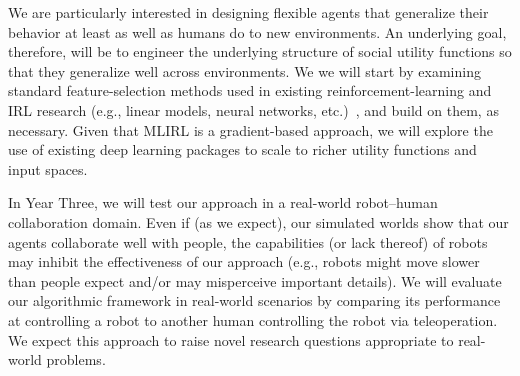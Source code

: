 We are particularly interested in designing flexible agents that
generalize their behavior at least as well as humans do to new
environments.
%
An underlying goal, therefore, will be to engineer the underlying
structure of social utility functions so that they generalize well
across environments.  We we will start by examining standard
feature-selection methods used in existing reinforcement-learning and
IRL 
research (e.g., linear models, neural networks,
etc.)~\cite{diuk2009adaptive,kolter2009regularization,li2009reinforcement,parr2008analysis},
and build on them, as necessary. Given that MLIRL is a gradient-based
approach, we will explore the use of existing deep learning packages
to scale to richer utility functions and input spaces.
%


In Year Three, we will test our approach in a real-world robot--human
collaboration domain.  Even if (as we expect), our simulated worlds
show that our agents collaborate well with people, the capabilities
(or lack thereof) of robots may inhibit the effectiveness of our
approach (e.g., robots might move slower than people expect and/or may
misperceive important details).  We will evaluate our algorithmic
framework in real-world scenarios by comparing its performance at
controlling a robot to another human controlling the robot via
teleoperation.  We expect this approach to raise novel research
questions appropriate to real-world problems.

